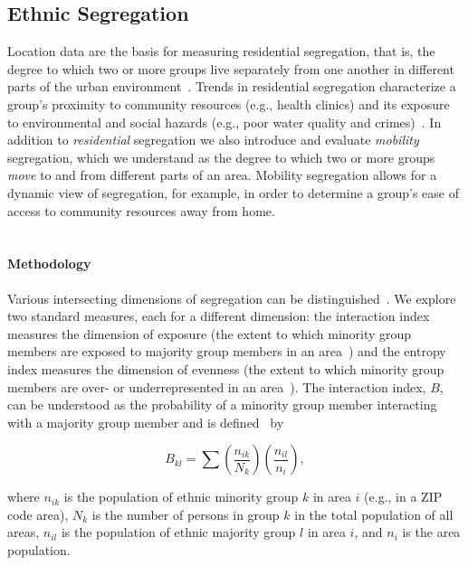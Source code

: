 \subsection{Ethnic Segregation}
\label{sec:ethnic-segregation}

Location data are the basis for measuring residential segregation, that is, the degree to which two or more groups live separately from one another in different parts of the urban environment~\cite{masseyAndDenton}. Trends in residential segregation characterize a group's proximity to community resources (e.g., health clinics) and its exposure to environmental and social hazards (e.g., poor water quality and crimes)~\cite{Reardon}. In addition to \emph{residential} segregation we also introduce and evaluate \emph{mobility} segregation, which we understand as the degree to which two or more groups \emph{move} to and from different parts of an area. Mobility segregation allows for a dynamic view of segregation, for example, in order to determine a group's ease of access to community resources away from home.
\\
\\

\paragraph{Methodology}
Various intersecting dimensions of segregation can be distinguished~\cite{masseyAndDenton}. We explore two standard measures, each for a different dimension: the interaction index measures the dimension of exposure (the extent to which minority group members are exposed to majority group members in an area~\cite{masseyAndDenton}) and the entropy index measures the dimension of evenness (the extent to which minority group members are over- or underrepresented in an area~\cite{masseyAndDenton}). The interaction index, $B$, can be understood as the probability of a minority group member interacting with a majority group member and is defined~\cite{White} by

\begin{equation}
\label{interaction}
	B_{kl} = \sum (\frac{n_{ik}}{N_k})(\frac{n_{il}}{n_i}),
\end{equation}

\noindent where $n_{ik}$ is the population of ethnic minority group $k$ in area $i$ (e.g., in a ZIP code area), $N_k$ is the number of persons in group $k$ in the total population of all areas, $n_{il}$ is the population of ethnic majority group $l$ in area $i$, and $n_i$ is the area population.

